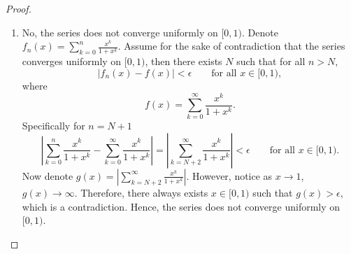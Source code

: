 \documentclass{article}
\begin{document}
\begin{proof}
\begin{enumerate}[label=\textbf{(\alph*)}]
        \item No, the series does not converge uniformly on $[0,1)$. 
        Denote $f_n(x) = \sum_{k=0}^{n}\frac{x^k}{1+x^k}$. Assume for the sake of contradiction that 
        the series converges uniformly on $[0,1)$, then there exists $N$ such that for all $n> N$,
        $$|f_n(x)-f(x)|<\epsilon \qquad \text{for all $x\in[0,1)$},$$ where 
        $$f(x)= \sum_{k=0}^{\infty}\frac{x^k}{1+x^k}.$$
        Specifically for $n=N+1$
        $$\left|\sum_{k=0}^{n}\frac{x^k}{1+x^k}-\sum_{k=0}^{\infty}\frac{x^k}{1+x^k}\right|
        = \left|\sum_{k=N+2}^{\infty}\frac{x^k}{1+x^k}\right|<\epsilon \qquad \text{for all $x\in[0,1)$}.$$
        Now denote $g(x)=\left|\sum_{k=N+2}^{\infty}\frac{x^k}{1+x^k}\right|$. However, notice 
        as $x\to1$, $g(x)\to \infty$. Therefore, there always exists $x\in[0,1)$ such that
        $g(x)>\epsilon$, which is a contradiction. Hence, the series does not converge uniformly
        on $[0,1)$.
        
        
    \end{enumerate}
\end{proof}

\newpage
\end{document}
